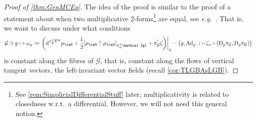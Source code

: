\documentclass[reqno,a4paper,oneside]{amsart}
\newcommand\mutot{\mu_\caG}
\theoremstyle{plain}
\theoremstyle{remark}
\theoremstyle{definition}
\begin{document}
\begin{proof}[Proof of \ref{thm:GenMCEq}]
\leavevmode\newline
The idea of the proof is similar to the proof of a statement about when two multiplicative 2-forms\footnote{See \ref{rem:SimplicialDifferentialStuff} later; multiplicativity is related to closedness w.r.t.\ a differential. However, we will not need this general notion.} are equal, see \textit{e.g.}\ \cite[\S 3, Cor.\ 3.4]{bursztyn2004integration}. That is, we want to discuss under what conditions 
\begin{equation*}
\mathcal{G} \ni g \mapsto \omega_g \coloneqq
\mleft.\mleft(\mathrm{d}^{\pi_{\mathcal{G}}^*\nabla^{\mathcal{G}}} \mutot
	+ \frac{1}{2} \mleft[ \mutot \stackrel{\wedge}{,} \mutot \mright]_{\pi_{\mathcal{G}}^*\mathcal{g}}
	+ \pi_{\mathcal{G}}^! \zeta\mright)\mright|_g
	- \mleft( g, \mathrm{Ad}_{g^{-1}} \circ \zeta_x \circ \mleft(\mathrm{D}_g \pi_{\mathcal{G}}, \mathrm{D}_g \pi_{\mathcal{G}}\mright) \mright)
\end{equation*}
is constant along the fibres of $\mathcal{G}$, that is, constant along the flows of vertical tangent vectors, the left-invariant vector fields (recall \ref{cor:TLGBAsLGB}). 


\end{proof}
\end{document}

